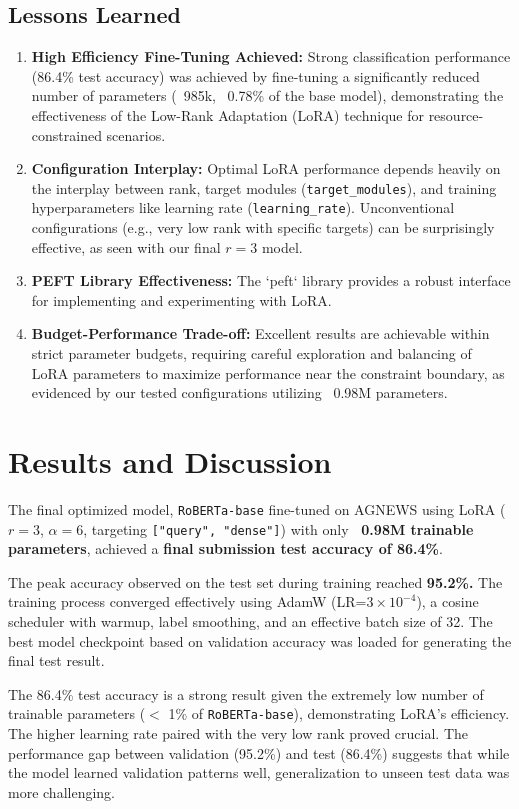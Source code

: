 \documentclass[twoside, 11pt]{article}
\begin{document}
\subsection{Lessons Learned}
\begin{enumerate}
    \item \textbf{High Efficiency Fine-Tuning Achieved:} Strong classification performance (86.4\% test accuracy) was achieved by fine-tuning a significantly reduced number of parameters (~985k, ~0.78\% of the base model), demonstrating the effectiveness of the Low-Rank Adaptation (LoRA) technique for resource-constrained scenarios.
    \item \textbf{Configuration Interplay:} Optimal LoRA performance depends heavily on the interplay between rank, target modules (\texttt{target\_modules}), and training hyperparameters like learning rate (\texttt{learning\_rate}). Unconventional configurations (e.g., very low rank with specific targets) can be surprisingly effective, as seen with our final $r=3$ model.
    \item \textbf{PEFT Library Effectiveness:} The `peft` library provides a robust interface for implementing and experimenting with LoRA.
    \item \textbf{Budget-Performance Trade-off:} Excellent results are achievable within strict parameter budgets, requiring careful exploration and balancing of LoRA parameters to maximize performance near the constraint boundary, as evidenced by our tested configurations utilizing ~0.98M parameters.
\end{enumerate}
\section{Results and Discussion}
\label{sec:results}
The final optimized model, \texttt{RoBERTa-base} fine-tuned on AGNEWS using LoRA ($r=3$, $\alpha=6$, targeting \texttt{["query", "dense"]}) with only \textbf{~0.98M trainable parameters}, achieved a \textbf{final submission test accuracy of 86.4\%}.

The peak accuracy observed on the test set during training reached \textbf{95.2\%}\textbf. The training process converged effectively using AdamW (LR=$3 \times 10^{-4}$), a cosine scheduler with warmup, label smoothing, and an effective batch size of 32. The best model checkpoint based on validation accuracy was loaded for generating the final test result.

The 86.4\% test accuracy is a strong result given the extremely low number of trainable parameters ($<$ 1\% of \texttt{RoBERTa-base}), demonstrating LoRA's efficiency. The higher learning rate paired with the very low rank proved crucial. The performance gap between validation (95.2\%) and test (86.4\%) suggests that while the model learned validation patterns well, generalization to unseen test data was more challenging.
\end{document}
